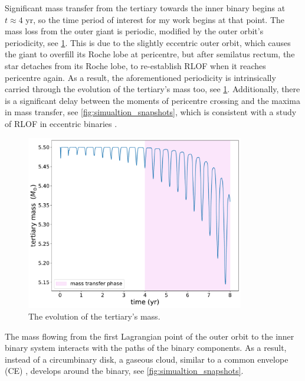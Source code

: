 Significant mass transfer from the tertiary towards the inner binary begins at $t \approx 4$ yr, so the time period of interest for my work begins at that point. The mass loss from the outer giant is periodic, modified by the outer orbit's periodicity, see \cref{fig:accretion_inc_00_mass_loss}. This is due to the slightly eccentric outer orbit, which causes the giant to overfill its Roche lobe at pericentre, but after semilatus rectum, the star detaches from its Roche lobe, to re-establish RLOF when it reaches pericentre again. As a result, the aforementioned periodicity is intrinsically carried through the evolution of the tertiary's mass too, see \cref{fig:accretion_inc_00_mass_loss}. Additionally, there is a significant delay between the moments of pericentre crossing and the maxima in mass transfer, see \cref{fig:simualtion_snapshots}, which is consistent with a study of RLOF in eccentric binaries \citep{lajoie2010mass}.
\begin{figure}[!htb]
    \centering
    \includegraphics[width=0.85\textwidth]{Thesis/graphs/inc_00/accretion_inc_00_mass_loss.pdf}
    \caption{The evolution of the tertiary's mass.}
    \label{fig:accretion_inc_00_mass_loss}
\end{figure}
The mass flowing from the first Lagrangian point of the outer orbit to the inner binary system interacts with the paths of the binary components. As a result, instead of a circumbinary disk, a gaseous cloud, similar to a common envelope (CE) \citep{ivanova2013common}, develops around the binary, see \cref{fig:simualtion_snapshots}. 

